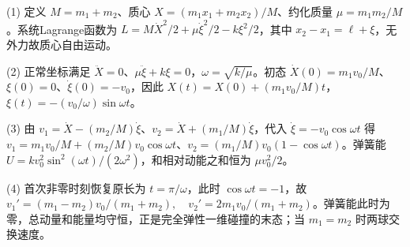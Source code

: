 (1) 定义 \(M=m_1+m_2\)、质心 \(X=(m_1x_1+m_2x_2)/M\)、约化质量 \(\mu=m_1m_2/M\)。系统Lagrange函数为 \(L=M\dot X^2/2+\mu\dot\xi^2/2-k\xi^2/2\)，其中 \(x_2-x_1=\ell+\xi\)，无外力故质心自由运动。

(2) 正常坐标满足 \(\ddot X=0\)、\(\mu\ddot\xi+k\xi=0\)，\(\omega=\sqrt{k/\mu}\)。初态 \(\dot X(0)=m_1v_0/M\)、\(\xi(0)=0\)、\(\dot\xi(0)=-v_0\)，因此 \(X(t)=X(0)+(m_1v_0/M)t\)，\(\boxed{\xi(t)=-(v_0/\omega)\sin\omega t}\)。

(3) 由 \(v_1=\dot X-(m_2/M)\dot\xi\)、\(v_2=\dot X+(m_1/M)\dot\xi\)，代入 \(\dot\xi=-v_0\cos\omega t\) 得 \(v_1=m_1v_0/M+(m_2/M)v_0\cos\omega t\)、\(v_2=(m_1/M)v_0(1-\cos\omega t)\)。弹簧能 \(U=k v_0^2\sin^2(\omega t)/(2\omega^2)\)，和相对动能之和恒为 \(\mu v_0^2/2\)。

(4) 首次非零时刻恢复原长为 \(t=\pi/\omega\)，此时 \(\cos\omega t=-1\)，故 \(\boxed{v_1'=(m_1-m_2)v_0/(m_1+m_2),\quad v_2'=2m_1v_0/(m_1+m_2)}\)。弹簧能此时为零，总动量和能量均守恒，正是完全弹性一维碰撞的末态；当 \(m_1=m_2\) 时两球交换速度。
